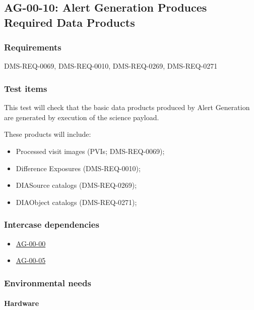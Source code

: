 \subsection{AG-00-10: Alert Generation Produces Required Data Products}
\label{ag-00-10}

\subsubsection{Requirements}

DMS-REQ-0069, DMS-REQ-0010, DMS-REQ-0269, DMS-REQ-0271

\subsubsection{Test items}
\label{ag-00-10-items}

This test will check that the basic data products produced by Alert
Generation are generated by execution of the science payload.

These products will include:

\begin{itemize}

  \item{Processed visit images (PVIs; DMS-REQ-0069);}
  \item{Difference Exposures (DMS-REQ-0010);}
  \item{DIASource catalogs (DMS-REQ-0269);}
  \item{DIAObject catalogs (DMS-REQ-0271);}

\end{itemize}

\subsubsection{Intercase dependencies}

\begin{itemize}

  \item{\hyperref[ag-00-00]{AG-00-00}}
  \item{\hyperref[ag-00-05]{AG-00-05}}

\end{itemize}

\subsubsection{Environmental needs}

\paragraph{Hardware}

